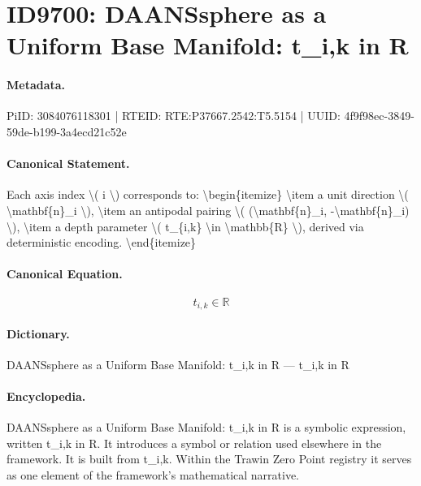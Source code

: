\section*{ID9700: DAANSsphere as a Uniform Base Manifold: t\_i,k in R}
\paragraph{Metadata.}
PiID: 3084076118301 | RTEID: RTE:P37667.2542:T5.5154 | UUID: 4f9f98ec-3849-59de-b199-3a4ecd21c52e

\paragraph{Canonical Statement.}
Each axis index \textbackslash{}( i \textbackslash{}) corresponds to: \textbackslash{}begin\{itemize\} \textbackslash{}item a unit direction \textbackslash{}( \textbackslash{}mathbf\{n\}\_i \textbackslash{}), \textbackslash{}item an antipodal pairing \textbackslash{}( (\textbackslash{}mathbf\{n\}\_i, -\textbackslash{}mathbf\{n\}\_i) \textbackslash{}), \textbackslash{}item a depth parameter \textbackslash{}( t\_\{i,k\} \textbackslash{}in \textbackslash{}mathbb\{R\} \textbackslash{}), derived via deterministic encoding. \textbackslash{}end\{itemize\}

\paragraph{Canonical Equation.}
\[
t_{i,k} \in \mathbb{R}
\]

\paragraph{Dictionary.}
DAANSsphere as a Uniform Base Manifold: t\_i,k in R — t\_i,k in R

\paragraph{Encyclopedia.}
DAANSsphere as a Uniform Base Manifold: t\_i,k in R is a symbolic expression, written t\_i,k in R. It introduces a symbol or relation used elsewhere in the framework. It is built from t\_i,k. Within the Trawin Zero Point registry it serves as one element of the framework's mathematical narrative.
